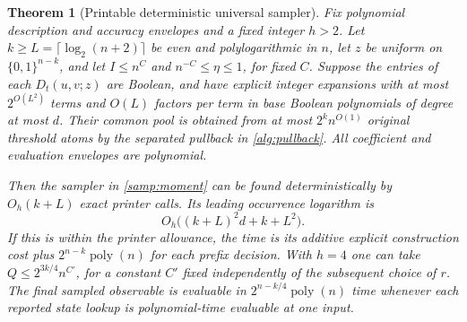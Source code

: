 \documentclass[11pt,letterpaper]{article}
\newtheorem{theorem}{Theorem}[section]
\theoremstyle{definition}
\theoremstyle{remark}
\newcommand{\poly}{\operatorname{poly}}
\begin{document}
\begin{theorem}[Printable deterministic universal sampler]
\label{samp:printable}
Fix polynomial description and accuracy envelopes and a fixed integer $h>2$.
Let $k\ge L=\lceil\log_2(n+2)\rceil$ be even and polylogarithmic in
$n$, let $z$ be uniform on $\{0,1\}^{n-k}$, and let $I\le n^{C}$
and $n^{-C}\le\eta\le1$, for fixed $C$.
Suppose the entries of each $D_t(u,v;z)$ are Boolean, and have explicit
integer expansions with at most $2^{O(L^2)}$ terms and $O(L)$ factors
per term in base Boolean polynomials of degree at most $d$. Their common
pool is obtained from at most $2^k n^{O(1)}$ original threshold atoms
by the separated pullback in \cref{alg:pullback}. All coefficient and
evaluation envelopes are polynomial.

Then the sampler in \cref{samp:moment} can be found deterministically
by $O_h(k+L)$ exact printer calls. Its leading occurrence logarithm is
\begin{equation}
O_h\bigl((k+L)^2d+k+L^2\bigr).
\label{samp:load}
\end{equation}
If this is within the printer allowance, the time is its additive
explicit construction cost plus $2^{n-k}\poly(n)$ for each prefix
decision. With $h=4$ one can take
$Q\le2^{3k/4}n^{C'}$, for a constant $C'$ fixed independently of the
subsequent choice of $r$. The final sampled observable is evaluable in
$2^{n-k/4}\poly(n)$ time whenever each reported state lookup is
polynomial-time evaluable at one input.
\end{theorem}
\end{document}
